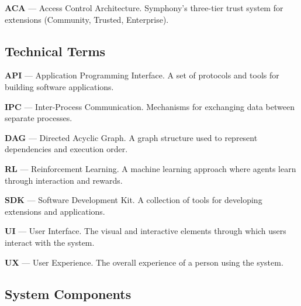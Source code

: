 \noindent\textbf{ACA} --- Access Control Architecture. Symphony's three-tier trust system for extensions (Community, Trusted, Enterprise).

\subsection*{Technical Terms}

\vspace{0.3cm}

\noindent\textbf{API} --- Application Programming Interface. A set of protocols and tools for building software applications.

\vspace{0.2cm}

\noindent\textbf{IPC} --- Inter-Process Communication. Mechanisms for exchanging data between separate processes.

\vspace{0.2cm}

\noindent\textbf{DAG} --- Directed Acyclic Graph. A graph structure used to represent dependencies and execution order.

\vspace{0.2cm}

\noindent\textbf{RL} --- Reinforcement Learning. A machine learning approach where agents learn through interaction and rewards.

\vspace{0.2cm}

\noindent\textbf{SDK} --- Software Development Kit. A collection of tools for developing extensions and applications.

\vspace{0.2cm}

\noindent\textbf{UI} --- User Interface. The visual and interactive elements through which users interact with the system.

\vspace{0.2cm}

\noindent\textbf{UX} --- User Experience. The overall experience of a person using the system.

\subsection*{System Components}

\vspace{0.3cm}

